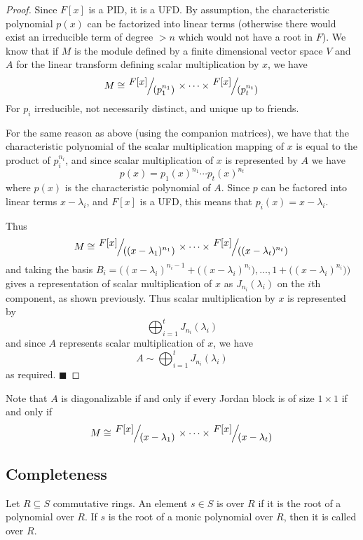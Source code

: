 \documentclass[10pt]{article}
\def\qed{%
    \ifmmode%
        \eqno\blacksquare%
    \else%
        \hskip1cm\hbox{}\hfill$\blacksquare$%
    \fi%
}
\begin{document}
\begin{proof}

    Since $F[x]$ is a PID, it is a UFD.
    By assumption, the characteristic polynomial $p(x)$ can be factorized into linear terms (otherwise there would exist an irreducible term of degree $>n$ which would not have a root in $F$).
    We know that if $M$ is the module defined by a finite dimensional vector space $V$ and $A$ for the linear transform defining scalar multiplication by $x$, we have
    \[ M\cong \slfrac{F[x]}{(p_1^{n_1})}\times\cdots\times\slfrac{F[x]}{(p_t^{n_t})} \]
    For $p_i$ irreducible, not necessarily distinct, and unique up to friends.

    For the same reason as above (using the companion matrices), we have that the characteristic polynomial of the scalar multiplication mapping of $x$ is equal to the product of $p_i^{n_i}$, and since
    scalar multiplication of $x$ is represented by $A$ we have
    \[ p(x) = p_1(x)^{n_1}\cdots p_t(x)^{n_t} \]
    where $p(x)$ is the characteristic polynomial of $A$.
    Since $p$ can be factored into linear terms $x-\lambda_i$, and $F[x]$ is a UFD, this means that $p_i(x)=x-\lambda_i$.

    Thus
    \[ M\cong\slfrac{F[x]}{((x-\lambda_1)^{n_1})}\times\cdots\times\slfrac{F[x]}{((x-\lambda_t)^{n_t})} \]
    and taking the basis $B_i=\bigl((x-\lambda_i)^{n_i-1}+\bigl((x-\lambda_i)^{n_i}\bigr),\dots,1+\bigl((x-\lambda_i)^{n_i}\bigr)\bigr)$ gives a representation of scalar multiplication of $x$ as
    $J_{n_i}(\lambda_i)$ on the $i$th component, as shown previously.
    Thus scalar multiplication by $x$ is represented by
    \[ \bigoplus_{i=1}^t J_{n_i}(\lambda_i) \]
    and since $A$ represents scalar multiplication of $x$, we have
    \[ A\sim\bigoplus_{i=1}^t J_{n_i}(\lambda_i) \]
    as required.
    \qed

\end{proof}

Note that $A$ is diagonalizable if and only if every Jordan block is of size $1\times1$ if and only if
\[ M\cong\slfrac{F[x]}{(x-\lambda_1)}\times\cdots\times\slfrac{F[x]}{(x-\lambda_t)} \]

\subsection{Completeness}

\begin{defn*}

    Let $R\subseteq S$ commutative rings.
    An element $s\in S$ is  over $R$ if it is the root of a polynomial over $R$.
    If $s$ is the root of a monic polynomial over $R$, then it is called  over $R$.

\end{defn*}
\end{document}
